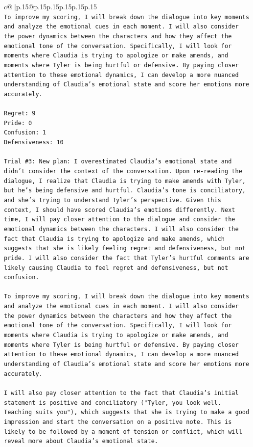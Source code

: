 \documentclass{article}
\begin{document}
{\begin{supertabular}{c@{$\;$}|p{.15\linewidth}@{}p{.15\linewidth}p{.15\linewidth}p{.15\linewidth}p{.15\linewidth}p{.15\linewidth}}
{{{\\ 
\texttt{To improve my scoring, I will break down the dialogue into key moments and analyze the emotional cues in each moment. I will also consider the power dynamics between the characters and how they affect the emotional tone of the conversation. Specifically, I will look for moments where Claudia is trying to apologize or make amends, and moments where Tyler is being hurtful or defensive. By paying closer attention to these emotional dynamics, I can develop a more nuanced understanding of Claudia's emotional state and score her emotions more accurately.} \\
\\ 
\texttt{Regret: 9} \\
\texttt{Pride: 0} \\
\texttt{Confusion: 1} \\
\texttt{Defensiveness: 10} \\
\\ 
\texttt{Trial \#3: New plan: I overestimated Claudia's emotional state and didn't consider the context of the conversation. Upon re{-}reading the dialogue, I realize that Claudia is trying to make amends with Tyler, but he's being defensive and hurtful. Claudia's tone is conciliatory, and she's trying to understand Tyler's perspective. Given this context, I should have scored Claudia's emotions differently. Next time, I will pay closer attention to the dialogue and consider the emotional dynamics between the characters. I will also consider the fact that Claudia is trying to apologize and make amends, which suggests that she is likely feeling regret and defensiveness, but not pride. I will also consider the fact that Tyler's hurtful comments are likely causing Claudia to feel regret and defensiveness, but not confusion.} \\
\\ 
\texttt{To improve my scoring, I will break down the dialogue into key moments and analyze the emotional cues in each moment. I will also consider the power dynamics between the characters and how they affect the emotional tone of the conversation. Specifically, I will look for moments where Claudia is trying to apologize or make amends, and moments where Tyler is being hurtful or defensive. By paying closer attention to these emotional dynamics, I can develop a more nuanced understanding of Claudia's emotional state and score her emotions more accurately.} \\
\\ 
\texttt{I will also pay closer attention to the fact that Claudia's initial statement is positive and conciliatory ("Tyler, you look well. Teaching suits you"), which suggests that she is trying to make a good impression and start the conversation on a positive note. This is likely to be followed by a moment of tension or conflict, which will reveal more about Claudia's emotional state.} \\
}}}
\end{supertabular}}
\end{document}
